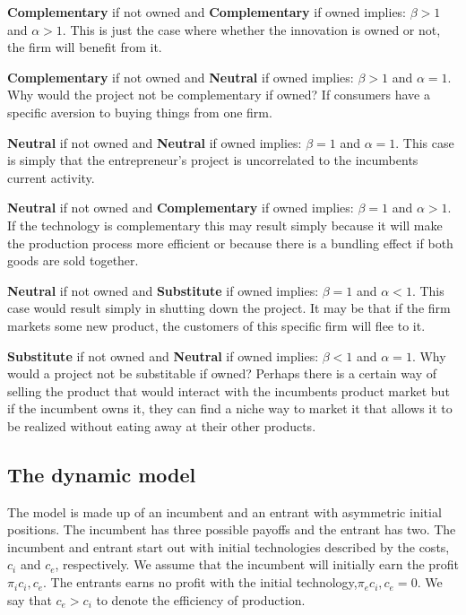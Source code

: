 \documentclass[11pt]{article}
\begin{document}
\textbf{Complementary} if not owned and \textbf{Complementary} if owned implies: $\beta>1$ and $\alpha>1$. This is just the case where whether the innovation is owned or not, the firm will benefit from it.

\textbf{Complementary} if not owned and \textbf{Neutral} if owned implies: $\beta>1$ and $\alpha=1$. Why would the project not be complementary if owned? If consumers have a specific aversion to buying things from one firm. 

\textbf{Neutral} if not owned and \textbf{Neutral} if owned implies: $\beta=1$ and $\alpha=1$. This case is simply that the entrepreneur's project is uncorrelated to the incumbents current activity.  

\textbf{Neutral} if not owned and \textbf{Complementary} if owned implies: $\beta=1$ and $\alpha>1$. If the technology is complementary this may result simply because it will make the production process more efficient or because there is a bundling effect if both goods are sold together. 

\textbf{Neutral} if not owned and \textbf{Substitute} if owned implies: $\beta=1$ and $\alpha<1$. This case would result simply in shutting down the project. It may be that if the firm markets some new product, the customers of this specific firm will flee to it. 

\textbf{Substitute} if not owned and \textbf{Neutral} if owned implies: $\beta<1$ and $\alpha=1$. Why would a project not be substitable if owned? Perhaps there is a certain way of selling the product that would interact with the incumbents product market but if the incumbent owns it, they can find a niche way to market it that allows it to be realized without eating away at their other products.


\subsection{The dynamic model}\label{dynamic}

The model is made up of an incumbent and an entrant with asymmetric initial positions. The incumbent has three possible payoffs and the entrant has two. The incumbent and entrant start out with initial technologies described by the costs, $c_i$ and $c_e$, respectively. We assume that the incumbent will initially earn the profit $\pi_i{c_i,c_e}$. The entrants earns no profit with the initial technology,$\pi_e{c_i,c_e}=0$. We say that $c_e>c_i$ to denote the efficiency of production. 
\end{document}
